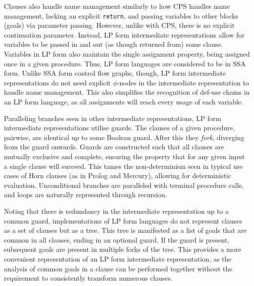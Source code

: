 Clauses also handle name management similarly to how CPS handles name management, lacking an explicit \texttt{return}, and passing variables to other blocks (goals) via parameter passing. However, unlike with CPS, there is no explicit continuation parameter. Instead, LP form intermediate representations allow for variables to be passed in and out (as though returned from) some clause. Variables in LP form also maintain the single assignment property, being assigned once in a given procedure. Thus, LP form languages are considered to be in SSA form. Unlike SSA form control flow graphs, though, LP form intermediate representations do not need explicit $\phi$-nodes in the intermediate representation to handle name management. This also simplifies the recognition of def-use chains in an LP form language, as all assignments will reach every usage of each variable.

Paralleling branches seen in other intermediate representations, LP form intermediate representations utilise guards. The clauses of a given procedure, pairwise, are identical up to some Boolean guard. After this they \textit{fork}, diverging from the guard onwards. Guards are constructed such that all clauses are mutually exclusive and complete, ensuring the property that for any given input a single clause will succeed. This tames the non-determinism seen in typical use cases of Horn clauses (as in Prolog and Mercury), allowing for deterministic evaluation. Unconditional branches are paralleled with terminal procedure calls, and loops are naturally represented through recursion.

Noting that there is redundancy in the intermediate representation up to a common guard, implementations of LP form languages do not represent clauses as a set of clauses but as a tree. This tree is manifested as a list of goals that are common in all clauses, ending in an optional guard. If the guard is present, subsequent goals are present in multiple forks of the tree. This provides a more convenient representation of an LP form intermediate representation, as the analysis of common goals in a clause can be performed together without the requirement to consistently transform numerous clauses.

